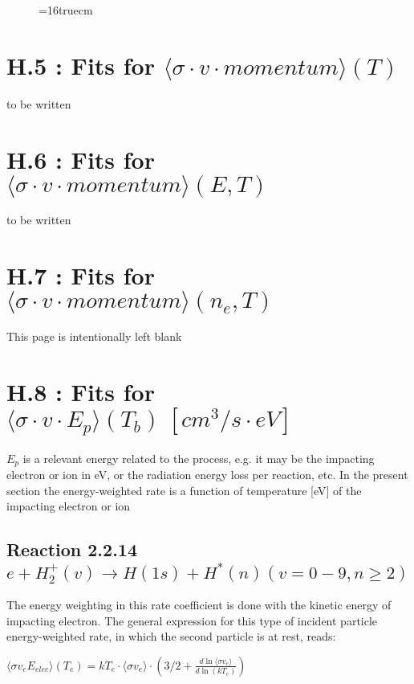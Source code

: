 \documentclass[12pt,dvipdfmx]{article}
\begin{document}
\begin{figure} \label{2.2.17mad}
\epsfxsize=16truecm
\end{figure}
\newpage

\section{H.5 : Fits for $\langle\sigma \cdot v \cdot momentum \rangle (T) $}

to be written

\newpage

\section{H.6 : Fits for $\langle\sigma \cdot v \cdot momentum \rangle (E,T) $ }

to be written

\newpage

\section{H.7 : Fits for $\langle\sigma \cdot v \cdot momentum \rangle (n_e,T) $ }

\newpage
This page is intentionally left blank
\newpage

\section{H.8 : Fits for $\langle\sigma \cdot v \cdot E_p \rangle (T_b) \ [cm^3/s
\cdot eV]$}

$E_p$ is a relevant energy related to the process, e.g. it may be the impacting electron or ion in eV,
or the radiation energy loss per reaction, etc.
In the present section
the energy-weighted rate is a function of temperature [eV] of the
impacting electron or ion

\subsection{
Reaction 2.2.14   $e + H_2^+(v) \rightarrow H(1s) + H^*(n)   (v=0-9, n \ge 2) $
}
The energy weighting in this rate coefficient is done with the kinetic energy of
impacting electron. The general expression for this type of incident particle energy-weighted
rate, in which the second particle is at rest, reads:

$\langle\sigma v_e E_{elec}\rangle(T_e) = kT_e \cdot \langle\sigma v_e\rangle \cdot
\left(3/2 + \frac{d \ln \langle\sigma v_e\rangle}{d \ln(kT_e)}\right)$
\end{document}
